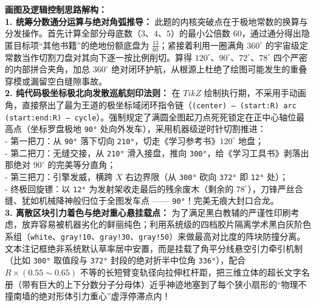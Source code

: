 \vspace{0.4cm}
{\small\color{blue!70!black}
\textbf{画图及逻辑控制思路解构：}\\
\textbf{1. 统筹分数通分运算与绝对角弧推导：} 此题的内核突破点在于极地常数的换算与分发操作。首先计算全部分母底数（$3、4、5$）的最小公倍数 60，通过通分得出隐匿目标项“其他书籍”的绝地份额底盘为 $\frac{13}{60}$；紧接着利用一圈满角 $360^\circ$ 的宇宙级定常数当作切割刀盘对其向下逐一按比例削切。算得 $120^\circ、90^\circ、72^\circ、78^\circ$ 四个严密的内部拼合夹角，加总 $360^\circ$ 绝对闭环护航，从根源上杜绝了绘图可能发生的重叠穿模或漏留空白缝隙事故。\\
\textbf{2. 纯代码极坐标极北向发散巡航刻印法则：} 在 $TikZ$ 绘制执行期，不采用手动画角，直接祭出了最为王道的极坐标域闭环指令链（\texttt{(center) -- (start:R) arc (start:end:R) -- cycle}）。强制规定了满圆全图起刀点死死锁定在正中心轴位最高点（坐标罗盘极地 \texttt{90°} 处向外发车），采用机器级逆时针切割推进：\\
- 第一把刀：从 \texttt{90°} 落下切向 \texttt{210°}，切走《学习参考书》$120^\circ$ 地盘；\\
- 第二把刀：无缝交接，从 \texttt{210°} 滑入接盘，推向 \texttt{300°}，给《学习工具书》剥落出那绝对 $90^\circ$ 的完美等分直角；\\
- 第三把刀：引擎发威，横跨 $X$ 右边界限（从 \texttt{300°} 砍向 \texttt{372°} 即 \texttt{12°} 处）；\\
- 终极回旋镖：以 \texttt{12°} 为发射架收走最后的残余废木（剩余的 $78^\circ$），刀锋严丝合缝、犹如机械降神般归位于全图发车点 —— \texttt{90°}！完美无痕大封口合龙。\\
\textbf{3. 离散区块引力着色与绝对重心悬挂载点：} 为了满足黑白教辅的严谨性印刷考虑，放弃容易被机器劣化的鲜丽纯色；利用系统级的四档胶片隔离学术黑白灰阶色系组（\texttt{white}、\texttt{gray!10}、\texttt{gray!30}、\texttt{gray!50}）来做最高对比度的阵块防撞分离。文本注记框绝非系统默认草率居中安置，而是挂载了角平分线悬空引力牵引机制（比如 \texttt{300°} 取值段与 \texttt{372°} 封段的绝对折半中位角 \texttt{336°}），配合 $R \times (0.55\sim 0.65)$ 不等的长短臂变轨径向拉伸杠杆距，把三维立体的超长文字名册（带有巨大的上下分数分子分母体）近乎神迹地塞到了每个狭小扇形的“物理不撞南墙的绝对形体引力重心”虚浮停滞点内！
}

\newpage



\newpage

